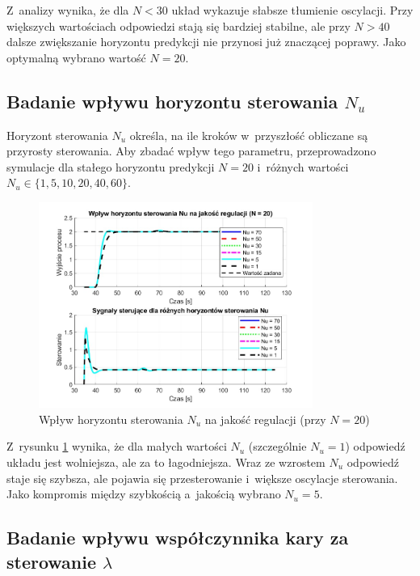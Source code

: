 \documentclass[a4paper,titlepage,11pt,floatssmall]{mwrep}
\begin{document}
Z~analizy wynika, że dla $N < 30$ układ wykazuje słabsze tłumienie oscylacji. Przy większych wartościach odpowiedzi stają się bardziej stabilne, ale przy $N > 40$ dalsze zwiększanie horyzontu predykcji nie przynosi już znaczącej poprawy. Jako optymalną wybrano wartość $N = 20$.

\subsection{Badanie wpływu horyzontu sterowania $N_u$}

Horyzont sterowania $N_u$ określa, na ile kroków w~przyszłość obliczane są przyrosty sterowania. Aby zbadać wpływ tego parametru, przeprowadzono symulacje dla stałego horyzontu predykcji $N = 20$ i~różnych wartości $N_u \in \{1, 5, 10, 20, 40, 60\}$.

\begin{figure}[H]
    \centering
    \includegraphics[width=0.8\textwidth]{kod/wykresy/horyzont_sterowania_porownanie.jpg}
    \caption{Wpływ horyzontu sterowania $N_u$ na jakość regulacji (przy $N = 20$)}
    \label{fig:Nu_comparison}
\end{figure}

Z~rysunku \ref{fig:Nu_comparison} wynika, że dla małych wartości $N_u$ (szczególnie $N_u = 1$) odpowiedź układu jest wolniejsza, ale za to łagodniejsza. Wraz ze wzrostem $N_u$ odpowiedź staje się szybsza, ale pojawia się przesterowanie i~większe oscylacje sterowania. Jako kompromis między szybkością a~jakością wybrano $N_u = 5$.

\subsection{Badanie wpływu współczynnika kary za sterowanie $\lambda$}
\end{document}
